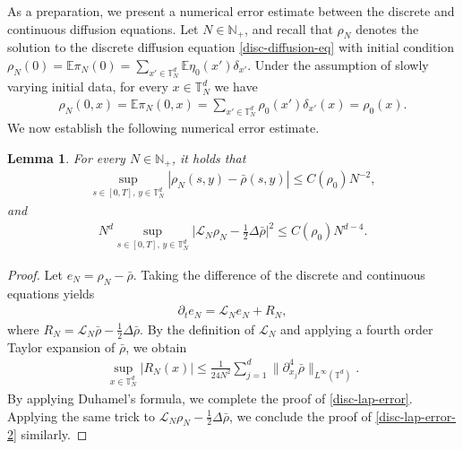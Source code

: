 \documentclass[UTF-8,reqno]{amsart}
\numberwithin{equation}{section}
\newtheorem{lemma}[theorem]{Lemma}
\def\leq{\leqslant}
\def\leq{\leqslant}
\begin{document}
As a preparation, we present a numerical error estimate between the discrete and continuous diffusion equations. Let $N \in \mathbb{N}_+$, and recall that $\rho_N$ denotes the solution to the discrete diffusion equation \eqref{disc-diffusion-eq} with initial condition $\rho_N(0) = \mathbb{E}\pi_N(0) = \sum_{x' \in \mathbb{T}^d_N} \mathbb{E}\eta_0(x') \delta_{x'}$. Under the assumption of slowly varying initial data, for every $x \in \mathbb{T}^d_N$ we have 
\begin{align*}
	\rho_N(0,x) = \mathbb{E}\pi_N(0,x) 
	= \sum_{x' \in \mathbb{T}^d_N} \rho_0(x') \delta_{x'}(x)
	= \rho_0(x).
\end{align*}
We now establish the following numerical error estimate.
\begin{lemma}
	For every $N \in \mathbb{N}_+$, it holds that 
	\begin{align}\label{disc-lap-error}
		\sup_{s \in [0,T],\, y \in \mathbb{T}^d_N} 
		|\rho_N(s,y) - \bar{\rho}(s,y)| 
		\leq C(\rho_0) N^{-2},
	\end{align}
	and 
	\begin{align}\label{disc-lap-error-2}
	N^d \sup_{s \in [0,T],\, y \in \mathbb{T}^d_N}\Big|\mathcal{L}_N \rho_N - \frac{1}{2}\Delta \bar{\rho}\Big|^2\leq C(\rho_0)N^{d-4}. 
	\end{align}

\end{lemma}
\begin{proof}
	Let $e_N = \rho_N - \bar{\rho}$. Taking the difference of the discrete and continuous equations yields 
	\begin{align*}
		\partial_t e_N = \mathcal{L}_N e_N + R_N,
	\end{align*}
	where $R_N = \mathcal{L}_N \bar{\rho} - \tfrac{1}{2}\Delta \bar{\rho}$. By the definition of $\mathcal{L}_N$ and applying a fourth order Taylor expansion of $\bar{\rho}$, we obtain 
	\begin{align*}
		\sup_{x \in \mathbb{T}^d_N} |R_N(x)|
		\leq \frac{1}{24 N^{2}}
		\sum_{j=1}^d \|\partial_{x_j}^4 \bar{\rho}\|_{L^{\infty}(\mathbb{T}^d)}.
	\end{align*}
	By applying Duhamel's formula, we complete the proof of \eqref{disc-lap-error}. Applying the same trick to $\mathcal{L}_N\rho_N-\frac{1}{2}\Delta\bar{\rho}$, we conclude the proof of \eqref{disc-lap-error-2} similarly. 
\end{proof}
\end{document}
